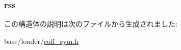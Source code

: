 \label{structecoff__fdr_a6a181d266cb4b74f21a425cc960b970a}
\hypertarget{structecoff__fdr_a0c20f5c284acb09945a575da6c3b6fad}{
\subsubsection[{rss}]{ {\bf rss}}}
\label{structecoff__fdr_a0c20f5c284acb09945a575da6c3b6fad}


この構造体の説明は次のファイルから生成されました:\begin{DoxyCompactItemize}
\item 
base/loader/\hyperlink{coff__sym_8h}{coff\_\-sym.h}\end{DoxyCompactItemize}

